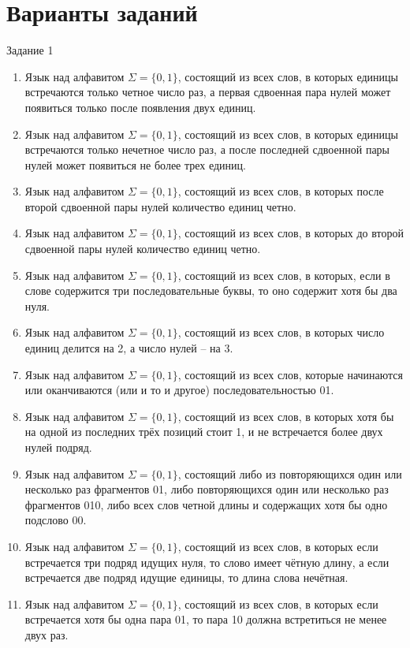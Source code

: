 \renewcommand{\theAlgoEnv}{\Alph{chapter}.\arabic{AlgoEnv}}

\chapter{Варианты заданий}
Задание 1
\begin{enumerate}
\item Язык над алфавитом $\Sigma=\{0,1\}$, состоящий из всех слов, в которых единицы встречаются только четное число раз, а первая сдвоенная пара нулей может появиться только после появления двух единиц.
\item Язык над алфавитом $\Sigma=\{0,1\}$, состоящий из всех слов, в которых единицы встречаются только нечетное число раз, а после последней сдвоенной пары нулей может появиться не более трех единиц.
\item Язык над алфавитом $\Sigma=\{0,1\}$, состоящий из всех слов, в которых после второй сдвоенной пары нулей количество единиц четно.
\item Язык над алфавитом $\Sigma=\{0,1\}$, состоящий из всех слов, в которых до второй сдвоенной пары нулей количество единиц четно.
\item Язык над алфавитом $\Sigma=\{0,1\}$, состоящий из всех слов, в которых, если в слове содержится три последовательные буквы, то оно содержит хотя бы два нуля.
\item Язык над алфавитом $\Sigma=\{0,1\}$, состоящий из всех слов, в которых число единиц делится на 2, а число нулей -- на 3.
\item Язык над алфавитом $\Sigma=\{0,1\}$, состоящий из всех слов, которые начинаются или оканчиваются (или и то и другое) последовательностью 01.
\item Язык над алфавитом $\Sigma=\{0,1\}$, состоящий из всех слов, в которых хотя бы на одной из последних трёх позиций стоит 1, и не встречается более двух нулей подряд.
\item Язык над алфавитом $\Sigma=\{0,1\}$, состоящий либо из повторяющихся один или несколько раз фрагментов 01, либо повторяющихся один или несколько раз фрагментов 010, либо всех слов четной длины и содержащих хотя бы одно подслово 00.
\item Язык над алфавитом $\Sigma=\{0,1\}$, состоящий из всех слов, в которых если встречается три подряд идущих нуля, то слово имеет чётную длину, а если встречается две подряд идущие единицы, то длина слова нечётная.
\item Язык над алфавитом $\Sigma=\{0,1\}$, состоящий из всех слов, в которых если встречается хотя бы одна пара 01, то пара 10 должна встретиться не менее двух раз.

\end{enumerate}
